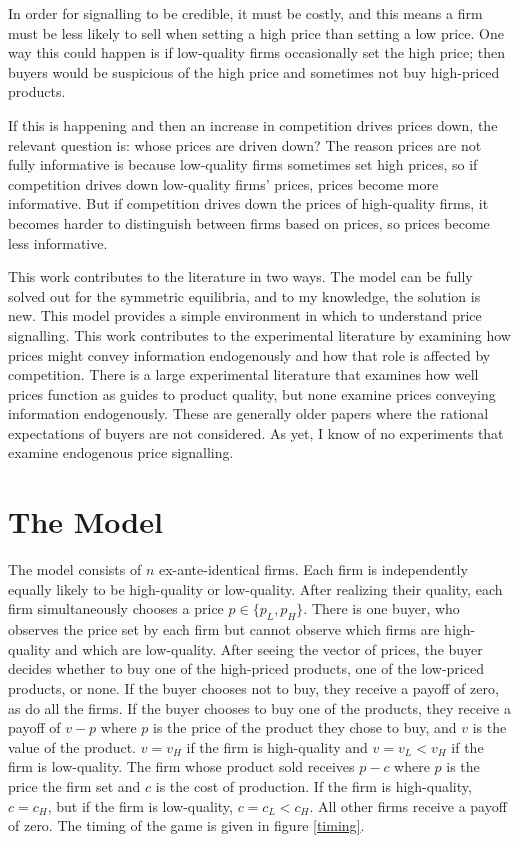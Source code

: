 \documentclass[12pt]{article}
\begin{document}
In order for signalling to be credible, it must be costly, and this means a firm must be less likely to sell when setting a high price than setting a low price. One way this could happen is if low-quality firms occasionally set the high price; then buyers would be suspicious of the high price and sometimes not buy high-priced products.

If this is happening and then an increase in competition drives prices down, the relevant question is: whose prices are driven down? The reason prices are not fully informative is because low-quality firms sometimes set high prices, so if competition drives down low-quality firms' prices, prices become more informative. But if competition drives down the prices of high-quality firms, it becomes harder to distinguish between firms based on prices, so prices become less informative.

This work contributes to the literature in two ways. The model can be fully solved out for the symmetric equilibria, and to my knowledge, the solution is new. This model provides a simple environment in which to understand price signalling. This work contributes to the experimental literature by examining how prices might convey information endogenously and how that role is affected by competition. There is a large experimental literature that examines how well prices function as guides to product quality, but none examine prices conveying information endogenously. These are generally older papers where the rational expectations of buyers are not considered. As yet, I know of no experiments that examine endogenous price signalling.




\section{The Model}

The model consists of $n$ ex-ante-identical firms. Each firm is independently equally likely to be high-quality or low-quality. After realizing their quality, each firm simultaneously chooses a price $p \in \{p_L,p_H\}$. There is one buyer, who observes the price set by each firm but cannot observe which firms are high-quality and which are low-quality. After seeing the vector of prices, the buyer decides whether to buy one of the high-priced products, one of the low-priced products, or none. If the buyer chooses not to buy, they receive a payoff of zero, as do all the firms. If the buyer chooses to buy one of the products, they receive a payoff of $v - p$ where $p$ is the price of the product they chose to buy, and $v$ is the value of the product. $v = v_H$ if the firm is high-quality and $v = v_L < v_H$ if the firm is low-quality. The firm whose product sold receives $p - c$ where $p$ is the price the firm set and $c$ is the cost of production. If the firm is high-quality, $c = c_H$, but if the firm is low-quality, $c = c_L < c_H$. All other firms receive a payoff of zero. The timing of the game is given in figure \ref{timing}.
\end{document}
